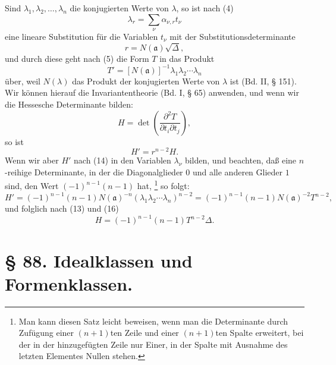 \documentclass[11pt]{article}
\begin{document}
Sind $\lambda_1,\lambda_2,
\ldots,\lambda_n$ die konjugierten Werte von $\lambda$, so ist nach (4)
\begin{equation}
 \lambda_r=\sum_\nu \alpha_{\nu,r}t_\nu\tag{12}
\end{equation}
eine lineare Substitution für die Variablen $t_\nu$ mit der Substitutionsdeterminante
\begin{equation}
 r=N(\mathfrak a)\sqrt{\Delta},\tag{13}
\end{equation}
und durch diese geht nach (5) die Form $T$ in das Produkt
\begin{equation}
 T'=[N(\mathfrak a)]^{-1}\lambda_1\lambda_2\cdots\lambda_n\tag{14}
\end{equation}
über, weil $N(\lambda)$ das Produkt der konjugierten Werte von $\lambda$ ist (Bd. II, § 151). Wir können hierauf die Invariantentheorie (Bd. I, § 65) anwenden, und wenn wir die Hessesche Determinante bilden:
\begin{equation}
 H=\det\left(\frac{\partial^2T}{\partial t_i\partial t_j}\right),\tag{15}
\end{equation}
so ist
\begin{equation}
 H'=r^{n-2}H.\tag{16}
\end{equation}
Wenn wir aber $H'$ nach (14) in den Variablen $\lambda_\nu$ bilden, und beachten, daß eine $n$-reihige Determinante, in der die Diagonalglieder $0$ und alle anderen Glieder $1$ sind, den Wert $(-1)^{n-1}(n-1)$ hat,
\footnote{Man kann diesen Satz leicht beweisen, wenn man die Determinante durch Zufügung einer $(n+1)$ten Zeile und einer $(n+1)$ten Spalte erweitert, bei der in der hinzugefügten Zeile nur Einer, in der Spalte mit Ausnahme des letzten Elementes Nullen stehen.}
so folgt:
\[
 H'=(-1)^{n-1}(n-1)N(\mathfrak a)^{-n}(\lambda_1\lambda_2\cdots\lambda_n)^{n-2}
 =(-1)^{n-1}(n-1)N(\mathfrak a)^{-2}T^{n-2},
\]
und folglich nach (13) und (16)
\begin{equation}
 H=(-1)^{n-1}(n-1)T^{n-2}\Delta.\tag{17}
\end{equation}

\section*{§ 88. Idealklassen und Formenklassen.}
\end{document}
